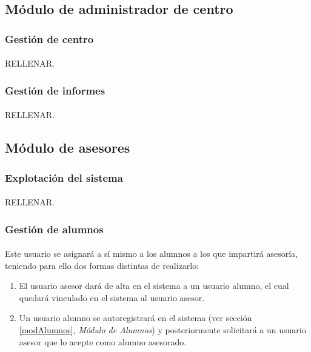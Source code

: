    \subsection{Módulo de administrador de centro}

      \subsubsection{Gestión de centro}

      \paragraph{}RELLENAR.

      \subsubsection{Gestión de informes}

      \paragraph{}RELLENAR.

   \subsection{Módulo de asesores}

      \subsubsection{Explotación del sistema}

      \paragraph{}RELLENAR.

      \subsubsection{Gestión de alumnos}\label{gestAlumnos}

      \paragraph{}Este usuario se asignará a sí mismo a los alumnos a los que
      impartirá asesoría, teniendo para ello dos formas distintas de realizarlo:

      \begin{enumerate}
       \item El usuario asesor dará de alta en el sistema a un usuario alumno,
             el cual quedará vinculado en el sistema al usuario asesor.
       \item Un usuario alumno se autoregistrará en el sistema (ver sección
       \ref{modAlumnos}, \textit{Módulo de Alumnos}) y posteriormente solicitará
       a un usuario asesor que lo acepte como alumno asesorado.
      \end{enumerate}


